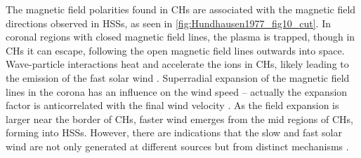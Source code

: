 The magnetic field polarities found in CHs are associated with the magnetic field directions observed in HSSs, as seen in \autoref{fig:Hundhausen1977_fig10_cut}. In coronal regions with closed magnetic field lines, the plasma is trapped, though in CHs it can escape, following the open magnetic field lines outwards into space. Wave-particle interactions heat and accelerate the ions in CHs, likely leading to the emission of the fast solar wind \citep{Hollweg2002}. Superradial expansion of the magnetic field lines in the corona has an influence on the wind speed -- actually the expansion factor is anticorrelated with the final wind velocity \citep{Wang1990}. As the field expansion is larger near the border of CHs, faster wind emerges from the mid regions of CHs, forming into HSSs. However, there are indications that the slow and fast solar wind are not only generated at different sources but from distinct mechanisms \citep{McGregor2011b}.


